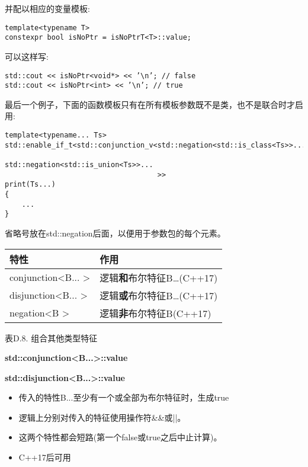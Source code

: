 并配以相应的变量模板:

\begin{lstlisting}[style=styleCXX]
template<typename T>
constexpr bool isNoPtr = isNoPtrT<T>::value;
\end{lstlisting}

可以这样写:

\begin{lstlisting}[style=styleCXX]
std::cout << isNoPtr<void*> << ’\n’; // false
std::cout << isNoPtr<int> << ’\n’; // true
\end{lstlisting}

最后一个例子，下面的函数模板只有在所有模板参数既不是类，也不是联合时才启用:

\begin{lstlisting}[style=styleCXX]
template<typename... Ts>
std::enable_if_t<std::conjunction_v<std::negation<std::is_class<Ts>>...,
									std::negation<std::is_union<Ts>>...
									>>
print(Ts...)
{
	...
}
\end{lstlisting}

省略号放在std::negation后面，以便用于参数包的每个元素。

\begin{table}[H]
	\begin{center}
	\begin{tabular}{l|l}
		\hline
		\textbf{特性}                            & \textbf{作用}                                   \\ \hline
		conjunction\textless{}B... \textgreater{} & 逻辑\textbf{和}布尔特征B…(C++17) \\ \hline
		disjunction\textless{}B... \textgreater{} & 逻辑\textbf{或}布尔特征B…(C++17)  \\ \hline
		negation\textless{}B \textgreater{}       & 逻辑\textbf{非}布尔特征B(C++17)     \\ \hline
	\end{tabular}
	\end{center}
\end{table}

\begin{center}
表D.8. 组合其他类型特征
\end{center}

\textbf{std::conjunction<B...>::value}

\textbf{std::disjunction<B...>::value}

\begin{itemize}
\item 
传入的特性B...至少有一个或全部为布尔特征时，生成true

\item 
逻辑上分别对传入的特征使用操作符\&\&或||。

\item 
这两个特性都会短路(第一个false或true之后中止计算)。

\item 
C++17后可用
\end{itemize}

